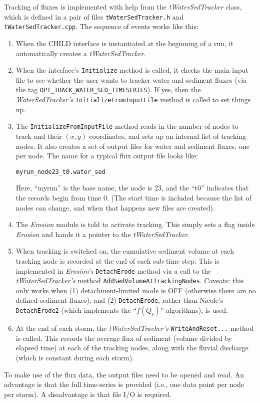\documentclass[12pt]{article}
\begin{document}
Tracking of fluxes is implemented with help from the {\em tWaterSedTracker} class, which is defined in a pair of files {\tt tWaterSedTracker.h} and {\tt tWaterSedTracker.cpp}. The sequence of events works like this:
\begin{enumerate}
\item
When the CHILD interface is instantiated at the beginning of a run, it automatically creates a {\em tWaterSedTracker}.
\item
When the interface's {\tt Initialize} method is called, it checks the main input file to see whether the user wants to tracker water and sediment fluxes (via the tag {\tt OPT\_TRACK\_WATER\_SED\_TIMESERIES}). If yes, then the {\em WaterSedTracker's} {\tt InitializeFromInputFile} method is called to set things up.
\item
The {\tt InitializeFromInputFile} method reads in the number of nodes to track and their $(x,y)$ coordinates, and sets up an internal list of tracking nodes. It also creates a set of output files for water and sediment fluxes, one per node. The name for a typical flux output file looks like:

{\tt myrun\_node23\_t0.water\_sed}

Here, ``myrun'' is the base name, the node is 23, and the ``t0'' indicates that the records begin from time 0. (The start time is included because the list of nodes can change, and when that happens new files are created).
\item
The {\em Erosion} module is told to activate tracking. This simply sets a flag inside {\em Erosion} and hands it a pointer to the {\em tWaterSedTracker}.
\item
When tracking is switched on, the cumulative sediment volume at each tracking node is recorded at the end of each sub-time step. This is implemented in {\em Erosion's} {\tt DetachErode} method via a call to the {\em tWaterSedTracker's} method {\tt AddSedVolumeAtTrackingNodes}. Caveats: this only works when (1) detachment-limited mode is OFF (otherwise there are no defined sediment fluxes), and (2) {\tt DetachErode}, rather than Nicole's {\tt DetachErode2} (which implements the ``$f(Q_s)$'' algorithms), is used.
\item
At the end of each storm, the {\em tWaterSedTracker's} {\tt WriteAndReset...} method is called. This records the average flux of sediment (volume divided by elapsed time) at each of the tracking nodes, along with the fluvial discharge (which is constant during each storm).
\end{enumerate}
To make use of the flux data, the output files need to be opened and read. An advantage is that the full time-series is provided (i.e., one data point per node per storm). A disadvantage is that file I/O is required. 
\end{document}
